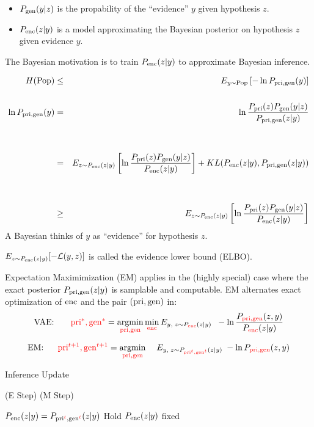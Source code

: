 {\begin{itemize}
\vfill
\item $P_{\mathrm{gen}}(y|z)$ is the propability of the ``evidence'' $y$ given hypothesis $z$.

\vfill
\item $P_{\mathrm{enc}}(z|y)$ is a model approximating the Bayesian posterior on hypothesis $z$ given evidence $y$.
\end{itemize}

\vfill
The Bayesian motivation is to train $P_{\mathrm{enc}}(z|y)$ to approximate Bayesian inference.

{\huge
\begin{eqnarray*}
H(\mathrm{Pop}) & \leq & E_{y\sim \mathrm{Pop}} \left[-\ln P_{\mathrm{pri},\mathrm{gen}}(y)\right] \\
\\
\ln P_{\mathrm{pri},\mathrm{gen}}(y) & =  & \ln \frac{P_{\mathrm{pri}}(z)P_{\mathrm{gen}}(y|z)}{P_{\mathrm{pri},\mathrm{gen}}(z|y)} \\
\\
\\
& = & E_{z \sim P_{\mathrm{enc}}(z|y)}\left[\ln \frac{P_{\mathrm{pri}}(z)P_{\mathrm{gen}}(y|z)}{P_{\mathrm{enc}}(z|y)}\right] + KL(P_{\mathrm{enc}}(z|y),P_{\mathrm{pri},\mathrm{gen}}(z|y)) \\
\\
\\
& \geq & E_{z \sim P_{\mathrm{enc}}(z|y)}\left[\ln \frac{P_{\mathrm{pri}}(z)P_{\mathrm{gen}}(y|z)}{P_{\mathrm{enc}}(z|y)}\right] \\
\end{eqnarray*}
}
A Bayesian thinks of $y$ as ``evidence'' for hypothesis $z$.

\vfill
{\color{red} $E_{z\sim P_{\mathrm{enc}}(z|y)}[-{\cal L}(y,z)]$} is called {\color{red} the evidence lower bound (ELBO)}.



Expectation Maximimization (EM) applies in the (highly special) case where the exact posterior $P_{\mathrm{pri},\mathrm{gen}}(z|y)$ is samplable and computable.
EM alternates exact optimization of $\mathrm{enc}$ and the pair $(\mathrm{pri},\mathrm{gen})$ in:
$$\mbox{VAE:}\;\;\;\;\;\;\; {\color{red} \mathrm{pri}^*,\mathrm{gen}^*} = \operatorname*{argmin}_{\color{red} \mathrm{pri},\mathrm{gen}} \min_{\color{red} \mathrm{enc}} E_{y,\;z \sim P_{\color{red} \mathrm{enc}}(z|y)}\;\;- \ln \frac{P_{\color{red} \mathrm{pri},\mathrm{gen}}(z,y)}{P_{\color{red} \mathrm{enc}}(z|y)}$$

\vfill
$$\mbox{EM:}\;\;\;\;\;\; {\color{red} \mathrm{pri}^{t+1},\mathrm{gen}^{t+1}} =  \operatorname*{argmin}_{\color{red} \mathrm{pri},\mathrm{gen}}\;\;\;\;E_{y,\;z \sim P_{\color{red} \mathrm{pri}^t,\mathrm{gen}^t}(z|y)}\; - \ln P_{\color{red} \mathrm{pri},\mathrm{gen}}(z,y)$$

\vfill
\centerline{\hspace{1em} Inference \hspace{6em} Update \hspace{2.5em}~}
\centerline{(E Step) \hspace{6em} (M Step) ~}
\centerline{ $P_{\mathrm{enc}}(z|y) = P_{\mathrm{pri}^{\color{red} t},\mathrm{gen}^{\color{red} t}}(z|y)$ \hspace{2.5em} Hold $P_{\mathrm{enc}}(z|y)$ fixed \hspace{0em}~}

}
